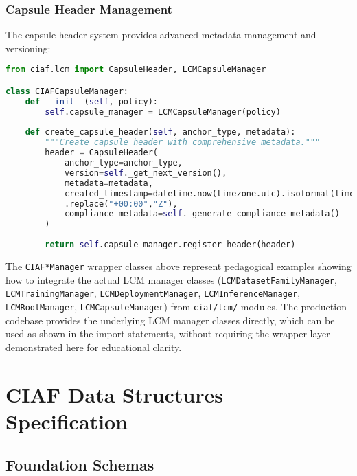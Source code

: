 \documentclass[12pt,a4paper]{article}
\begin{document}
\subsubsection{Capsule Header Management}

The capsule header system provides advanced metadata management and versioning:

\begin{lstlisting}[language=Python, caption=Capsule Header System]
from ciaf.lcm import CapsuleHeader, LCMCapsuleManager

class CIAFCapsuleManager:
    def __init__(self, policy):
        self.capsule_manager = LCMCapsuleManager(policy)
        
    def create_capsule_header(self, anchor_type, metadata):
        """Create capsule header with comprehensive metadata."""
        header = CapsuleHeader(
            anchor_type=anchor_type,
            version=self._get_next_version(),
            metadata=metadata,
            created_timestamp=datetime.now(timezone.utc).isoformat(timespec="microseconds")
            .replace("+00:00","Z"),
            compliance_metadata=self._generate_compliance_metadata()
        )
        
        return self.capsule_manager.register_header(header)
\end{lstlisting}

\begin{tcolorbox}[colframe=blue!70, colback=green!8, title={\textbf{Implementation Note}}]
The \texttt{CIAF*Manager} wrapper classes above represent pedagogical examples showing how to integrate the actual LCM manager classes (\texttt{LCMDatasetFamilyManager}, \texttt{LCMTrainingManager}, \texttt{LCMDeploymentManager}, \texttt{LCMInferenceManager}, \texttt{LCMRootManager}, \texttt{LCMCapsuleManager}) from \texttt{ciaf/lcm/} modules. The production codebase provides the underlying LCM manager classes directly, which can be used as shown in the import statements, without requiring the wrapper layer demonstrated here for educational clarity.
\end{tcolorbox}

\section{CIAF Data Structures Specification}

\subsection{Foundation Schemas}
\end{document}
